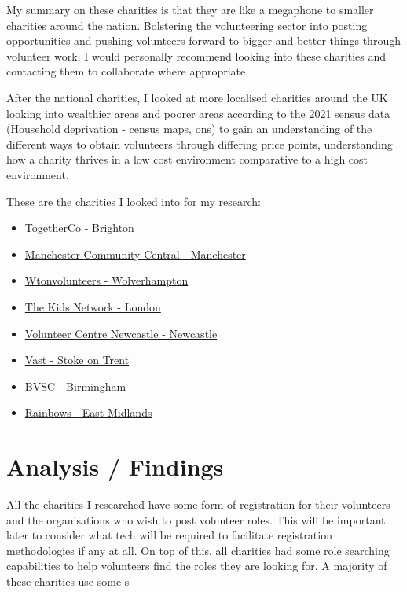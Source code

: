 \documentclass[11pt,a4paper]{article}
\begin{document}
My summary on these charities is that they are like a megaphone to smaller charities around the nation. Bolstering the volunteering sector into posting opportunities and pushing volunteers forward to bigger and better things through volunteer work. I would personally recommend looking into these charities and contacting them to collaborate where appropriate. 

\hfill \break
After the national charities, I looked at more localised charities around the UK looking into wealthier areas and poorer areas according to the 2021 sensus data (Household deprivation - census maps, ons) to gain an understanding of the different ways to obtain volunteers through differing price points, understanding how a charity thrives in a low cost environment comparative to a high cost environment.

\hfill \break
\hfill \break

These are the charities I looked into for my research: 

\begin{itemize}
    \item \href{https://togetherco.org.uk/}{ TogetherCo - Brighton}
    \item \href{https://manchestercommunitycentral.org/volunteer-centre-manchester}{Manchester Community Central - Manchester} 
    \item \href{https://wtonvolunteers.org/}{Wtonvolunteers - Wolverhampton} 
    \item \href{https://www.thekidsnetwork.org.uk/i-want-to-mentor?gad_source=1&gad_campaignid=22790719866&gbraid=0AAAAADRkgo9ZgrjOC3w8BTZU-XkR_5Yrm&gclid=Cj0KCQjw_vnQBhCxARIsADcZyxJlH0f1fgNgS3j_ExdetIzvqbD3oBxhusiLByw8EieP9HI863fcQbQaAlPtEALw_wcB}{The Kids Network - London} 
    \item \href{https://volunteercentrenewcastle.org.uk/}{Volunteer Centre Newcastle - Newcastle} 
    \item \href{https://vast.org.uk/}{Vast - Stoke on Trent} 
    \item \href{https://www.bvsc.org/}{BVSC - Birmingham} 
    \item \href{https://www.rainbows.co.uk/}{Rainbows - East Midlands} 
\end{itemize}

\section{Analysis / Findings}

All the charities I researched have some form of registration for their volunteers and the organisations who wish to post volunteer roles. This will be important later to consider what tech will be required to facilitate registration methodologies if any at all. On top of this, all charities had some role searching capabilities to help volunteers find the roles they are looking for. A majority of these charities use some s
\end{document}
